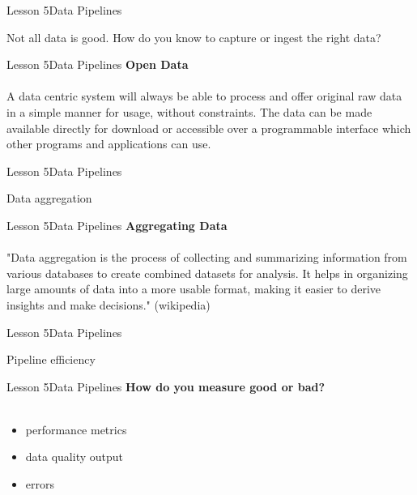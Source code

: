 \documentclass[aspectratio=1610]{beamer}
\begin{document}
\begin{frame}{Lesson 5}{Data Pipelines}
\Huge
\begin{center}
Not all data is good. How do you know to capture or ingest the right 
data? 
\end{center}
\end{frame}


\begin{frame}{Lesson 5}{Data Pipelines}
\LARGE
\textbf{Open Data}\\~\\
A data centric system will always be able to process and offer 
original raw data in a simple manner for usage, without constraints. 
The data can be made available directly for download or accessible 
over a programmable interface which other programs and applications 
can use.
\end{frame}


\begin{frame}{Lesson 5}{Data Pipelines}
\Huge
\begin{center}
Data aggregation
\end{center}
\end{frame}



\begin{frame}{Lesson 5}{Data Pipelines}
\LARGE
\textbf{Aggregating Data}\\~\\
"Data aggregation is the process of collecting and summarizing 
information from various databases to create combined datasets for 
analysis. It helps in organizing large amounts of data into a more 
usable format, making it easier to derive insights and make 
decisions." (wikipedia)
\end{frame}



\begin{frame}{Lesson 5}{Data Pipelines}
\Huge
\begin{center}
Pipeline efficiency
\end{center}
\end{frame}




\begin{frame}{Lesson 5}{Data Pipelines}
\LARGE
\textbf{How do you measure good or bad?}\\~\\
\begin{itemize}
    \item performance metrics
    \item data quality output
    \item errors
\end{itemize}
\end{frame}
\end{document}
